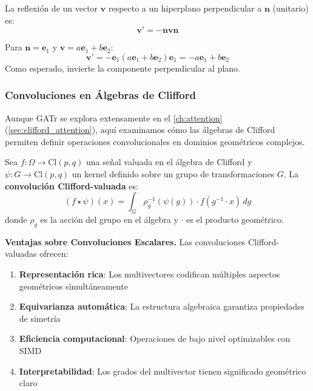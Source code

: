 \begin{example}[Reflexiones]\label{ex:reflexiones_clifford}
La reflexión de un vector $\mathbf{v}$ respecto a un hiperplano perpendicular a $\mathbf{n}$ (unitario) es:
\[\mathbf{v}' = -\mathbf{n} \mathbf{v} \mathbf{n}\]

Para $\mathbf{n} = \mathbf{e}_1$ y $\mathbf{v} = a\mathbf{e}_1 + b\mathbf{e}_2$:
\[\mathbf{v}' = -\mathbf{e}_1 (a\mathbf{e}_1 + b\mathbf{e}_2) \mathbf{e}_1 = -a\mathbf{e}_1 + b\mathbf{e}_2\]
Como esperado, invierte la componente perpendicular al plano.
\end{example}

\subsubsection{Convoluciones en Álgebras de Clifford}

Aunque GATr se explora extensamente en el \autoref{ch:attention} (\autoref{sec:clifford_attention}), aquí examinamos cómo las álgebras de Clifford permiten definir operaciones convolucionales en dominios geométricos complejos.

\begin{definition}\label{def:conv_clifford}
Sea $f: \Omega \to \text{Cl}(p,q)$ una señal valuada en el álgebra de Clifford y $\psi: G \to \text{Cl}(p,q)$ un kernel definido sobre un grupo de transformaciones $G$. La \textbf{convolución Clifford-valuada} es:
\[(f \star \psi)(x) = \int_G \rho_g^{-1}(\psi(g)) \cdot f(g^{-1} \cdot x) \, dg\]
donde $\rho_g$ es la acción del grupo en el álgebra y $\cdot$ es el producto geométrico.
\end{definition}

\textbf{Ventajas sobre Convoluciones Escalares.}\label{rem:ventajas_clifford_conv} Las convoluciones Clifford-valuadas ofrecen:
\begin{enumerate}
    \item \textbf{Representación rica}: Los multivectores codifican múltiples aspectos geométricos simultáneamente
    \item \textbf{Equivarianza automática}: La estructura algebraica garantiza propiedades de simetría
    \item \textbf{Eficiencia computacional}: Operaciones de bajo nivel optimizables con SIMD
    \item \textbf{Interpretabilidad}: Los grados del multivector tienen significado geométrico claro
\end{enumerate}

